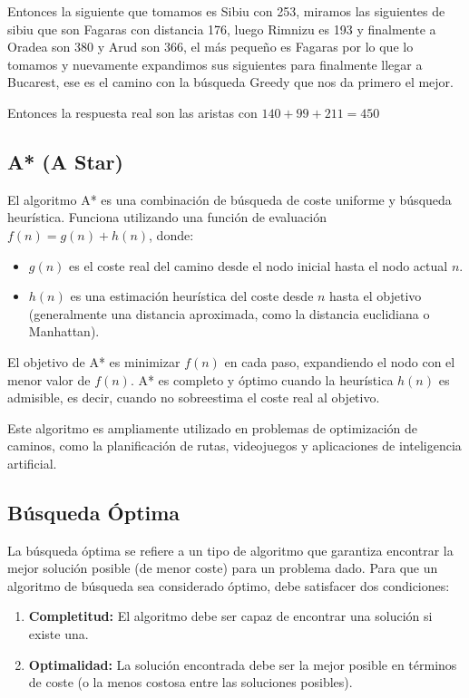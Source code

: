\begin{example}
	Entonces la siguiente que tomamos es Sibiu con 253, miramos las siguientes de sibiu que son Fagaras con distancia 176, luego Rimnizu es 193 y finalmente a Oradea son 380 y Arud son 366, el más pequeño es Fagaras por lo que lo tomamos y nuevamente expandimos sus siguientes para finalmente llegar a Bucarest, ese es el camino con la búsqueda Greedy que nos da primero el mejor.
\end{example}
Entonces la respuesta real son las aristas con $140+99+211=450$

\subsection{A* (A Star)}

El algoritmo A* es una combinación de búsqueda de coste uniforme y búsqueda heurística. Funciona utilizando una función de evaluación $f(n) = g(n) + h(n)$, donde:

\begin{itemize}
	\item \textbf{$g(n)$} es el coste real del camino desde el nodo inicial hasta el nodo actual $n$.
	\item \textbf{$h(n)$} es una estimación heurística del coste desde $n$ hasta el objetivo (generalmente una distancia aproximada, como la distancia euclidiana o Manhattan).
\end{itemize}

El objetivo de A* es minimizar $f(n)$ en cada paso, expandiendo el nodo con el menor valor de $f(n)$. A* es completo y óptimo cuando la heurística $h(n)$ es admisible, es decir, cuando no sobreestima el coste real al objetivo.

Este algoritmo es ampliamente utilizado en problemas de optimización de caminos, como la planificación de rutas, videojuegos y aplicaciones de inteligencia artificial.

\subsection{Búsqueda Óptima}

La búsqueda óptima se refiere a un tipo de algoritmo que garantiza encontrar la mejor solución posible (de menor coste) para un problema dado. Para que un algoritmo de búsqueda sea considerado óptimo, debe satisfacer dos condiciones:

\begin{enumerate}
	\item \textbf{Completitud:} El algoritmo debe ser capaz de encontrar una solución si existe una.
	\item \textbf{Optimalidad:} La solución encontrada debe ser la mejor posible en términos de coste (o la menos costosa entre las soluciones posibles).
\end{enumerate}

